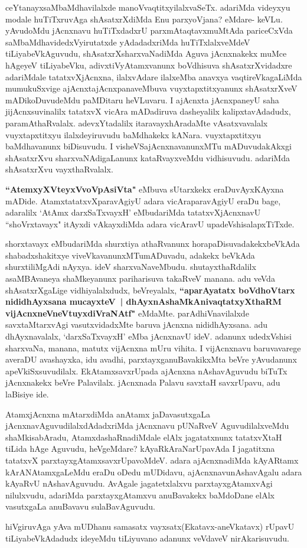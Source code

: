 \begin{artha}
ceYtanayxsaMbaMdhavilalxde manoVvaqtitxyilalxvaSeTx. adariMda videyxyu
modale huTiTxruvAga shAsatxrXdiMda Enu parxyoVjana? eMdare-
keVLu. yAvudoMdu jAcnxnavu huTiTxdadxrU parxmAtaqtavxmuMtAda
pariceCxVda saMbaMdhavidedxVyirutatxde  yAdadadxriMda huTiTxlalxveMdeV
tiLiyabeVkAguvudu, shAsatxrXsharxvaNadiMda Aguva  jAcnxnakekx muMce
hAgeyeV tiLiyabeVku, adivxtiVyAtamxvanunx boVdhisuva shAsatxrXvidadxre
adariMdale tatatxvXjAcnxna, ilalxvAdare ilalxeMba anavxya
vaqtireVkagaLiMda mumukuSxvige ajAcnxtajAcnxpanaveMbuva
vuyxtapxtitxyanunx shAsatxrXveV mADikoDuvudeMdu paMDitaru heVLuvaru. I
ajAcnxta jAcnxpaneyU saha jijAcnxsuvinalilx tatatxvX vicAra mADadiruva
dasheyalilx kalipxtavAdadudx, paramAthaRvalalx. adevxYtadalilx
itaravayxhAradaMte vAsatxvavalalx vuyxtapxtitxyu ilalxdeyiruvudu
baMdhakekx kANara. vuyxtapxtitxyu baMdhavanunx biDisuvudu. I
visheVSajAcnxnavanunxMTu mADuvudakAkxgi shAsatxrXvu
sharxvaNAdigaLanunx kataRvayxveMdu vidhisuvudu. adariMda shAsatxrXvu vayxthaRvalalx.  

\textbf{``AtemxyXVteyxVvoVpAsiVta"} eMbuva sUtarxkekx eraDuvAyxKAyxna
mADide. AtamxtatatxvXparavAgiyU adara vicAraparavAgiyU eraDu bage,
adaralilx `AtAmx darxSaTxvayxH' eMbudariMda tatatxvXjAcnxnavU ``shoVrxtavayx" itAyxdi
vAkayxdiMda adara vicAravU upadeVshisalapxTiTxde.

shorxtavayx eMbudariMda shurxtiya athaRvanunx
horapaDisuvadakekxbeVkAda shabadxshakitxye viveVkavanunxMTumADuvadu,
adakekx beVkAda shurxtiliMgAdi nAyxya. ideV
sharxvaNaveMbudu. shutayxthaRdalilx asaMBAvaneya shaMkeyanunx
pariharisuva takaRveV manana. adu veVda shAsatxrXgaLige
vidhiyalalxdudx, beVreyalalx, \textbf{``aparAyatatx boVdhoV\s \-tarx
nididhAyxsana mucayxteV~| dhAyxnAshaMkAnivaqtatxyXthaRM
vijAcnxneVneVtuyxdiVraNAtf"} eMdaMte. parAdhiVnavilalxde savxtaMtarxvAgi
vasutxvidadxMte baruva jAcnxna nididhAyxsana. adu dhAyxnavalalx,
`darxSaTxvayxH' eMba jAcnxnavU ideV. adanunx udedxVshisi sharxvaNa, manana,
matutx vijAcnxna mUru vihita. I vijAcnxnavu baruvavarege averaDU
avashayxka, idu avadhi, parxtayxganuBavakikxMta beVre yAvudanunx
apeVkiSxsuvudilalx. EkAtamxsavxrUpada ajAcnxna nAshavAguvudu biTuTx
jAcnxnakekx beVre Palavilalx. jAcnxnada Palavu savxtaH
savxrUpavu, adu laBisiye ide.
\end{artha}

\begin{artha}
AtamxjAcnxna mAtarxdiMda anAtamx jaDavasutxgaLa
jAcnxnavAguvudilalxdAdadxriMda  jAcnxnavu pUNaRveV AguvudilalxveMdu
shaMkisabAradu, AtamxdashaRnadiMdale elAlx jagatatxnunx tatatxvXtaH
tiLida hAge Aguvudu, heVgeMdare? kAyaRkAraNarUpavAda I jagatitxna
tatatxvX parxtayxgAtamxsavxrUpavoMdeV. adara ajAcnxnadiMda kAyARtamx
kArANAtamxgaLeMdu eraDu oDedu mUDidavu, ajAcnxnavunAshavAgalu
adara kAyaRvU nAshavAguvudu. AvAgale jagatetxlalxvu parxtayxgAtamxvAgi
nilulxvudu, adariMda parxtayxgAtamxvu anuBavakekx baMdoDane elAlx
vasutxgaLa anuBavavu sulaBavAguvudu.

hiVgiruvAga yAva mUDhanu samasatx vayxsatx(Ekatavx-aneVkatavx) rUpavU
tiLiyabeVkAdadudx ideyeMdu tiLiyuvano adanunx veVdaveV nirAkarisuvudu.
\end{artha}

